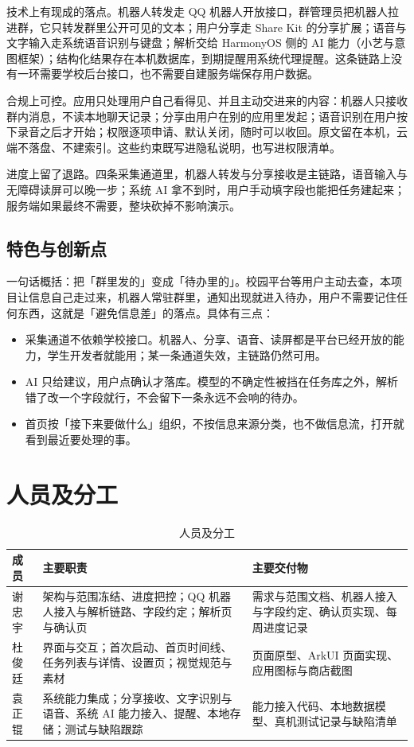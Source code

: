 \documentclass[12pt,a4paper,fontset=windows]{ctexart}
\begin{document}
技术上有现成的落点。机器人转发走 QQ 机器人开放接口，群管理员把机器人拉进群，它只转发群里公开可见的文本；用户分享走 Share Kit 的分享扩展；语音与文字输入走系统语音识别与键盘；解析交给 HarmonyOS 侧的 AI 能力（小艺与意图框架）；结构化结果存在本机数据库，到期提醒用系统代理提醒。这条链路上没有一环需要学校后台接口，也不需要自建服务端保存用户数据。

合规上可控。应用只处理用户自己看得见、并且主动交进来的内容：机器人只接收群内消息，不读本地聊天记录；分享由用户在别的应用里发起；语音识别在用户按下录音之后才开始；权限逐项申请、默认关闭，随时可以收回。原文留在本机，云端不落盘、不建索引。这些约束既写进隐私说明，也写进权限清单。

进度上留了退路。四条采集通道里，机器人转发与分享接收是主链路，语音输入与无障碍读屏可以晚一步；系统 AI 拿不到时，用户手动填字段也能把任务建起来；服务端如果最终不需要，整块砍掉不影响演示。

\subsection{特色与创新点}

一句话概括：把「群里发的」变成「待办里的」。校园平台等用户主动去查，本项目让信息自己走过来，机器人常驻群里，通知出现就进入待办，用户不需要记住任何东西，这就是「避免信息差」的落点。具体有三点：

\begin{itemize}
  \item 采集通道不依赖学校接口。机器人、分享、语音、读屏都是平台已经开放的能力，学生开发者就能用；某一条通道失效，主链路仍然可用。
  \item AI 只给建议，用户点确认才落库。模型的不确定性被挡在任务库之外，解析错了改一个字段就行，不会留下一条永远不会响的待办。
  \item 首页按「接下来要做什么」组织，不按信息来源分类，也不做信息流，打开就看到最近要处理的事。
\end{itemize}

\section{人员及分工}

\begin{table}[H]
\centering
\small
\begin{tabularx}{\textwidth}{@{}p{2.6cm}>{\raggedright\arraybackslash}X>{\raggedright\arraybackslash}X@{}}
\toprule
成员 & 主要职责 & 主要交付物 \\
\midrule
谢忠宇 & 架构与范围冻结、进度把控；QQ 机器人接入与解析链路、字段约定；解析页与确认页 & 需求与范围文档、机器人接入与字段约定、确认页实现、每周进度记录 \\
杜俊廷 & 界面与交互；首次启动、首页时间线、任务列表与详情、设置页；视觉规范与素材 & 页面原型、ArkUI 页面实现、应用图标与商店截图 \\
袁正锟 & 系统能力集成；分享接收、文字识别与语音、系统 AI 能力接入、提醒、本地存储；测试与缺陷跟踪 & 能力接入代码、本地数据模型、真机测试记录与缺陷清单 \\
\bottomrule
\end{tabularx}
\caption{人员及分工}
\label{tab:team}
\end{table}
\end{document}

